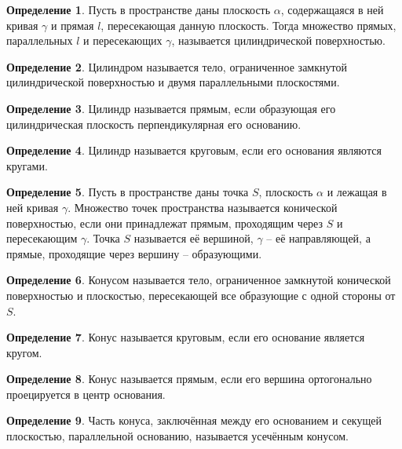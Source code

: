 \documentclass[12pt]{article}
\theoremstyle{definition}
\newtheorem{definition}{Определение}
\begin{document}
\begin{definition}
  Пусть в пространстве даны плоскость $\alpha$, содержащаяся в ней кривая $\gamma$ и прямая $l$, пересекающая данную плоскость. Тогда множество прямых, параллельных $l$ и пересекающих $\gamma$, называется цилиндрической поверхностью.
\end{definition}
\begin{definition}
  Цилиндром называется тело, ограниченное замкнутой цилиндрической поверхностью и двумя параллельными плоскостями.
\end{definition}
\begin{definition}
  Цилиндр называется прямым, если образующая его цилиндрическая плоскость перпендикулярная его основанию.
\end{definition}
\begin{definition}
  Цилиндр называется круговым, если его основания являются кругами.
\end{definition}
\begin{definition}
  Пусть в пространстве даны точка $S$, плоскость $\alpha$ и лежащая в ней кривая $\gamma$. Множество точек пространства называется конической поверхностью, если они принадлежат прямым, проходящим через $S$ и пересекающим $\gamma$. Точка $S$ называется её вершиной, $\gamma$ – её направляющей, а прямые, проходящие через вершину – образующими.
\end{definition}
\begin{definition}
  Конусом называется тело, ограниченное замкнутой конической поверхностью и плоскостью, пересекающей все образующие с одной стороны от $S$.
\end{definition}
\begin{definition}
  Конус называется круговым, если его основание является кругом.
\end{definition}
\begin{definition}
  Конус называется прямым, если его вершина ортогонально проецируется в центр основания.
\end{definition}
\begin{definition}
  Часть конуса, заключённая между его основанием и секущей плоскостью, параллельной основанию, называется усечённым конусом.
\end{definition}
\end{document}
